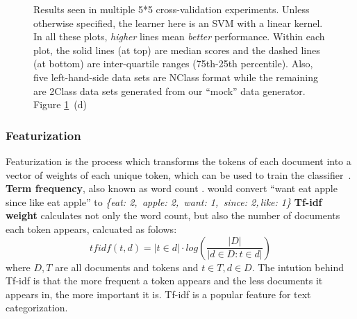 \documentclass{sig-alternate-05-2015}
\theoremstyle{break}
\begin{document}
\begin{figure}
{        \label{fig:balance}
    }
    \quad
    \quad
    \caption{Results seen in multiple 5*5 cross-validation experiments. Unless
    otherwise specified, the learner here is an SVM with a linear kernel.
    In all these plots, {\em higher} lines mean {\em better} performance.
    Within each plot,  the solid lines (at top) are median scores and 
    the dashed lines (at bottom) are inter-quartile ranges (75th-25th percentile). Also, five left-hand-side data sets are NClass
    format while the remaining are 2Class data sets generated from
    our ``mock'' data generator.
    Figure \ref{fig:all}~(d) 
    }
    \label{fig:all}
\end{figure}


\subsubsection{Featurization}

Featurization is the process which transforms the tokens of each document into a vector of weights of each unique token, which can be used to train the classifier~\cite{manning1999foundations}. 
\textbf{Term frequency}, also known as word count \cite{manning1999foundations}.   would convert ``want eat apple since like eat apple'' to
{\em \{eat: 2,\, apple: 2,\, want: 1,\, since: 2,\,like: 1\}}
\textbf{Tf-idf weight }calculates not only the word count, but also the number of documents each token appears, calcuated as folows:
\begin{equation}\label{eq:tfidf}
\mathit{tfidf}(t, d) = |t  \in d| \cdot  log\left(\frac{|D|}{|d\in D: t\in d|}\right)
\end{equation}
where $D,T$ are all documents and tokens and $t\in T,d\in D$.
The intution behind  Tf-idf   is that the more frequent a token appears and the less documents it appears in, the more important it is. Tf-idf  is  a popular feature for text categorization\cite{caropreso2001learner,moharanatag}. 
\end{document}
